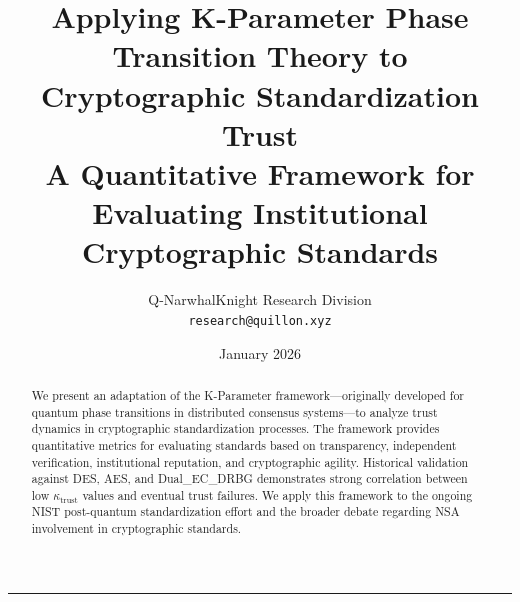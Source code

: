 \documentclass[11pt]{article}
\title{\LARGE\bfseries Applying K-Parameter Phase Transition Theory to Cryptographic Standardization Trust\vspace{0.5em}\\
\large A Quantitative Framework for Evaluating Institutional Cryptographic Standards}
\author{Q-NarwhalKnight Research Division\\
\texttt{research@quillon.xyz}}
\date{January 2026}
\begin{document}
\maketitle

\begin{abstract}
\noindent We present an adaptation of the K-Parameter framework---originally developed for quantum phase transitions in distributed consensus systems---to analyze trust dynamics in cryptographic standardization processes. The framework provides quantitative metrics for evaluating standards based on transparency, independent verification, institutional reputation, and cryptographic agility. Historical validation against DES, AES, and Dual\_EC\_DRBG demonstrates strong correlation between low $\kappa_{\text{trust}}$ values and eventual trust failures. We apply this framework to the ongoing NIST post-quantum standardization effort and the broader debate regarding NSA involvement in cryptographic standards.
\end{abstract}

\vspace{1em}
\hrule
\vspace{1em}
\end{document}
